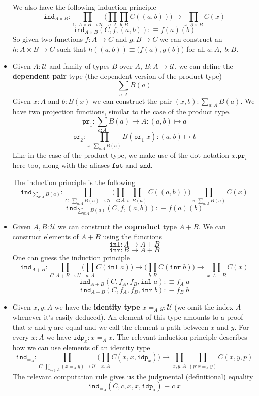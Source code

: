 \documentclass[12pt]{report}
\theoremstyle{definition}
\begin{document}
\begin{itemize}
	We also have the following induction principle
	$$\mathtt{ind}_{A\times B} : \prod_{C: A\times B \rightarrow \mathcal{U}}\big( \prod_{a:A}\prod_{b:B} C((a,b)) \big) \rightarrow \prod_{x: A\times B} C(x)$$
	$$\mathtt{ind}_{A\times B}(C, f, (a,b)) : \equiv f(a)(b)$$
	So given two functions $f: A\rightarrow C$ and $g : B \rightarrow C$ we can construct an $h : A\times B \rightarrow C$ such that $h((a,b)) \equiv \big(f(a), g(b)\big)$ for all $a:A,\; b:B$.
	\item Given $A : \mathcal{U}$ and family of types $B$ over $A$, $B : A \rightarrow \mathcal{U}$, we can define the \textbf{dependent pair} type (the dependent version of the product type)
	$$\sum_{a : A} B(a)$$
	Given $x : A$ and $b : B(x)$ we can construct the pair $(x,b) : \sum_{a : A} B(a)$. 
	We have two projection functions, similar to the case of the product type.
	$$\mathtt{pr}_1 : \sum_{a:A}B(a) \rightarrow A : (a,b) \mapsto a$$
	$$\mathtt{pr}_2 : \prod_{x : \sum_{a:A}B(a)}B(\mathtt{pr}_1\; x) : (a,b) \mapsto b$$
	Like in the case of the product type, we make use of the dot notation $x.\mathtt{pr}_i$ here too, along with the aliases $\mathtt{fst}$ and $\mathtt{snd}$. 

	The induction principle is the following
	$$\mathtt{ind}_{\sum_{a:A}B(a)} : \prod_{C : \sum_{a:A}B(a) \rightarrow \mathcal{U}}\Big( \prod_{a : A}\prod_{b : B(a)}C((a,b)) \Big)\prod_{x : \sum_{a:A}B(a)}C(x)$$
	$$\mathtt{ind}_{\sum_{a:A}B(a)}(C, f,(a,b) ) :\equiv f(a)(b)$$
	\item Given $A, B : \mathcal{U}$ we can construct the \textbf{coproduct} type $A + B$. 
	We can construct elements of $A + B$ using the functions
	$$\mathtt{inl} : A \rightarrow A+B$$
	$$\mathtt{inr} : B \rightarrow A+B$$
	One can guess the induction principle
	$$\mathtt{ind}_{A+B} : \prod_{C : A+B \rightarrow U} \Big(\prod_{a : A}C(\mathtt{inl}\;a)\Big) \rightarrow \Big(\prod_{b : B}C(\mathtt{inr}\;b)\Big) \rightarrow \prod_{x : A+ B}C(x)$$
	$$\mathtt{ind}_{A+B}(C, f_A, f_B, \mathtt{inl}\; a) :\equiv f_A\; a$$
	$$\mathtt{ind}_{A+B}(C, f_A, f_B, \mathtt{inr}\; b) :\equiv f_B\; b$$
	\item Given $x, y : A$ we have the \textbf{identity type} $x =_A y : \mathcal{U}$ (we omit the index $A$ whenever it's easily deduced). 
	An element of this type amounts to a proof that $x$ and $y$ are equal and we call the element a path between $x$ and $y$. 
	For every $x  :A$ we have $\mathtt{idp}_x : x=_A x$. 
	The relevant induction principle describes how we can use elements of an identity type
	$$\mathtt{ind}_{=_{A}} : \prod_{C : \prod_{x,y : A} (x =_A y) \rightarrow \mathcal{U}} \Big( \prod_{x : A}C(x,x,\mathtt{idp}_x) \Big) \rightarrow \prod_{x,y : A} \prod_{(p : x =_A y)} C(x,y,p)$$
	The relevant computation rule gives us the judgmental (definitional) equality 
	$$\mathtt{ind}_{=_A} (C,c,x,x,\mathtt{idp_x}) \equiv c\; x$$

	

\end{itemize}
\end{document}
